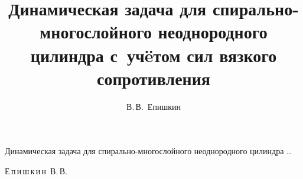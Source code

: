 
%

% 

%


% 

% 

%

% 





\renewcommand{\firstpage}{179}

\renewcommand{\lastpage}{189}














\title{Динамическая задача для спирально-многослойного неоднородного цилиндра с~уч\"eтом сил вязкого сопротивления}%

{Динамическая задача для спирально-многослойного неоднородного цилиндра \dots}%



\author{В.\,В.~Епишкин}%

{Е\,п\,и\,ш\,к\,и\,н~В.\,В.}%















